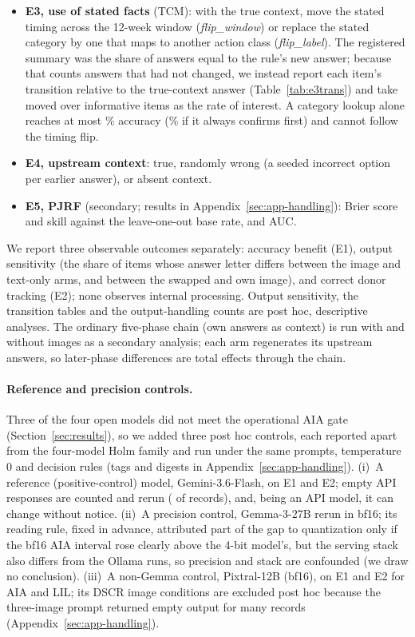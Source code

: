 \documentclass[11pt]{article}
\begin{document}
\begin{itemize}[leftmargin=*, itemsep=1pt, topsep=2pt]
    \item \textbf{E3, use of stated facts} (TCM): with the true context, move the stated timing across the 12-week window (\emph{flip\_window}) or replace the stated category by one that maps to another action class (\emph{flip\_label}). The registered summary was the share of answers equal to the rule's new answer; because that counts answers that had not changed, we instead report each item's transition relative to the true-context answer (Table~\ref{tab:e3trans}) and take moved over informative items as the rate of interest. A category lookup alone reaches at most \vfourTcmLookupEsc{}\% accuracy (\vfourTcmLookupConf{}\% if it always confirms first) and cannot follow the timing flip.
    \item \textbf{E4, upstream context}: true, randomly wrong (a seeded incorrect option per earlier answer), or absent context.
    \item \textbf{E5, PJRF} (secondary; results in Appendix~\ref{sec:app-handling}): Brier score and skill against the leave-one-out base rate, and AUC.
\end{itemize}

We report three observable outcomes separately: accuracy benefit (E1), output sensitivity (the share of items whose answer letter differs between the image and text-only arms, and between the swapped and own image), and correct donor tracking (E2); none observes internal processing. Output sensitivity, the transition tables and the output-handling counts are post hoc, descriptive analyses. The ordinary five-phase chain (own answers as context) is run with and without images as a secondary analysis; each arm regenerates its upstream answers, so later-phase differences are total effects through the chain.

\paragraph{Reference and precision controls.} Three of the four open models did not meet the operational AIA gate (Section~\ref{sec:results}), so we added three post hoc controls, each reported apart from the four-model Holm family and run under the same prompts, temperature 0 and decision rules (tags and digests in Appendix~\ref{sec:app-handling}). (i)~A reference (positive-control) model, Gemini-3.6-Flash, on E1 and E2; empty API responses are counted and rerun (\vfourCtrlEmpty{} of \vfourCtrlRecords{} records), and, being an API model, it can change without notice. (ii)~A precision control, Gemma-3-27B rerun in bf16; its reading rule, fixed in advance, attributed part of the gap to quantization only if the bf16 AIA interval rose clearly above the 4-bit model's, but the serving stack also differs from the Ollama runs, so precision and stack are confounded (we draw no conclusion). (iii)~A non-Gemma control, Pixtral-12B (bf16), on E1 and E2 for AIA and LIL; its DSCR image conditions are excluded post hoc because the three-image prompt returned empty output for many records (Appendix~\ref{sec:app-handling}).
\end{document}
